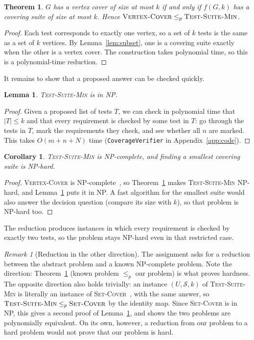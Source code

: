 \documentclass[conference]{IEEEtran}
\newtheorem{theorem}{Theorem}
\newtheorem{lemma}{Lemma}
\newtheorem{corollary}{Corollary}
\theoremstyle{definition}
\theoremstyle{remark}
\newtheorem{remark}{Remark}
\newcommand{\TSM}{\textsc{Test-Suite-Min}}
\newcommand{\VC}{\textsc{Vertex-Cover}}
\newcommand{\SC}{\textsc{Set-Cover}}
\begin{document}
\begin{theorem}\label{thm:reduction}
$G$ has a vertex cover of size at most $k$ if and only if $f(G,k)$ has a
covering suite of size at most $k$. Hence $\VC{} \le_p \TSM{}$.
\end{theorem}
\begin{proof}
Each test corresponds to exactly one vertex, so a set of $k$ tests is the
same as a set of $k$ vertices. By Lemma~\ref{lem:subset}, one is a covering
suite exactly when the other is a vertex cover. The construction takes
polynomial time, so this is a polynomial-time reduction.
\end{proof}

It remains to show that a proposed answer can be checked quickly.

\begin{lemma}\label{lem:np}
\TSM{} is in NP.
\end{lemma}
\begin{proof}
Given a proposed list of tests $T$, we can check in polynomial time that
$|T| \le k$ and that every requirement is checked by some test in $T$: go
through the tests in $T$, mark the requirements they check, and see whether
all $n$ are marked. This takes $O(m + n + N)$ time
(\texttt{CoverageVerifier} in Appendix~\ref{app:code}).
\end{proof}

\begin{corollary}\label{cor:npc}
\TSM{} is NP-complete, and finding a smallest covering suite is NP-hard.
\end{corollary}
\begin{proof}
\VC{} is NP-complete~\cite{karp1972}, so Theorem~\ref{thm:reduction} makes
\TSM{} NP-hard, and Lemma~\ref{lem:np} puts it in NP. A fast algorithm for
the smallest suite would also answer the decision question (compare its size
with $k$), so that problem is NP-hard too.
\end{proof}

The reduction produces instances in which every requirement is checked by
exactly two tests, so the problem stays NP-hard even in that restricted case.

\begin{remark}[Reduction in the other direction]
The assignment asks for a reduction between the abstract problem and a known
NP-complete problem. Note the direction: Theorem~\ref{thm:reduction}
(known problem $\le_p$ our problem) is what proves hardness. The opposite
direction also holds trivially: an instance $(U,\mathcal{S},k)$ of \TSM{} is
literally an instance of \SC{}~\cite{karp1972}, with the same answer, so
$\TSM{} \le_p \SC{}$ by the identity map. Since \SC{} is in NP, this gives a
second proof of Lemma~\ref{lem:np}, and shows the two problems are
polynomially equivalent. On its own, however, a reduction from our problem to
a hard problem would not prove that our problem is hard.
\end{remark}
\end{document}
